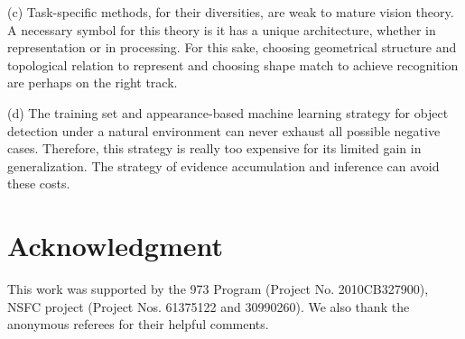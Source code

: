 \documentclass[journal]{IEEEtran}
\begin{document}
(c) Task-specific methods, for their diversities, are weak to mature vision theory. 
A necessary symbol for this theory is it has a unique architecture, whether in representation or in processing. 
For this sake, choosing geometrical structure and topological relation to represent and choosing shape match to achieve recognition are perhaps on the right track.

(d) The training set and appearance-based machine learning strategy for object detection under a natural environment can never exhaust all possible negative cases. Therefore, this strategy is really too expensive for its limited gain in generalization. The strategy of evidence accumulation and inference can avoid these costs.



\section*{Acknowledgment}

This work was supported by the 973 Program (Project No. 2010CB327900), NSFC project (Project Nos. 61375122 and 30990260). We also thank the anonymous referees for their helpful comments.


\ifCLASSOPTIONcaptionsoff
  \newpage
\fi







%
%
%




\end{document}
